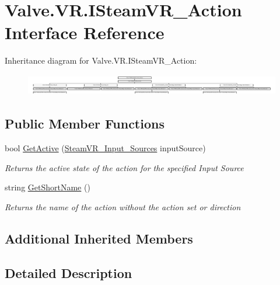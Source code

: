 \hypertarget{interface_valve_1_1_v_r_1_1_i_steam_v_r___action}{}\section{Valve.\+V\+R.\+I\+Steam\+V\+R\+\_\+\+Action Interface Reference}
\label{interface_valve_1_1_v_r_1_1_i_steam_v_r___action}
Inheritance diagram for Valve.\+V\+R.\+I\+Steam\+V\+R\+\_\+\+Action\+:\begin{figure}[H]
\begin{center}
\leavevmode
\includegraphics[height=0.938967cm]{interface_valve_1_1_v_r_1_1_i_steam_v_r___action}
\end{center}
\end{figure}
\subsection*{Public Member Functions}
\begin{DoxyCompactItemize}
\item 
bool \mbox{\hyperlink{interface_valve_1_1_v_r_1_1_i_steam_v_r___action_ad8d90df47697c9e5b43a0a46a241aa85}{Get\+Active}} (\mbox{\hyperlink{namespace_valve_1_1_v_r_a82e5bf501cc3aa155444ee3f0662853f}{Steam\+V\+R\+\_\+\+Input\+\_\+\+Sources}} input\+Source)
\begin{DoxyCompactList}\small\item\em Returns the active state of the action for the specified Input Source \end{DoxyCompactList}\item 
string \mbox{\hyperlink{interface_valve_1_1_v_r_1_1_i_steam_v_r___action_ae21f01096754a807c68543f61e63bf1c}{Get\+Short\+Name}} ()
\begin{DoxyCompactList}\small\item\em Returns the name of the action without the action set or direction \end{DoxyCompactList}\end{DoxyCompactItemize}
\subsection*{Additional Inherited Members}


\subsection{Detailed Description}


